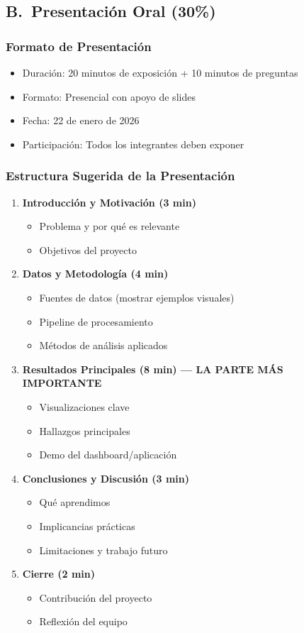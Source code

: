 \documentclass[11pt,a4paper]{article}
\begin{document}
\subsection{B.\ Presentación Oral (30\%)}
\subsubsection*{Formato de Presentación}
\begin{itemize}[leftmargin=*]
\item Duración: 20 minutos de exposición + 10 minutos de preguntas
\item Formato: Presencial con apoyo de slides
\item Fecha: 22 de enero de 2026
\item Participación: Todos los integrantes deben exponer
\end{itemize}

\subsubsection{Estructura Sugerida de la Presentación}
\begin{enumerate}[leftmargin=*]
\item \textbf{Introducción y Motivación (3 min)}
  \begin{itemize}[leftmargin=*]
  \item Problema y por qué es relevante
  \item Objetivos del proyecto
  \end{itemize}
\item \textbf{Datos y Metodología (4 min)}
  \begin{itemize}[leftmargin=*]
  \item Fuentes de datos (mostrar ejemplos visuales)
  \item Pipeline de procesamiento
  \item Métodos de análisis aplicados
  \end{itemize}
\item \textbf{Resultados Principales (8 min) --- LA PARTE MÁS IMPORTANTE}
  \begin{itemize}[leftmargin=*]
  \item Visualizaciones clave
  \item Hallazgos principales
  \item Demo del dashboard/aplicación
  \end{itemize}
\item \textbf{Conclusiones y Discusión (3 min)}
  \begin{itemize}[leftmargin=*]
  \item Qué aprendimos
  \item Implicancias prácticas
  \item Limitaciones y trabajo futuro
  \end{itemize}
\item \textbf{Cierre (2 min)}
  \begin{itemize}[leftmargin=*]
  \item Contribución del proyecto
  \item Reflexión del equipo
  \end{itemize}
\end{enumerate}
\end{document}

